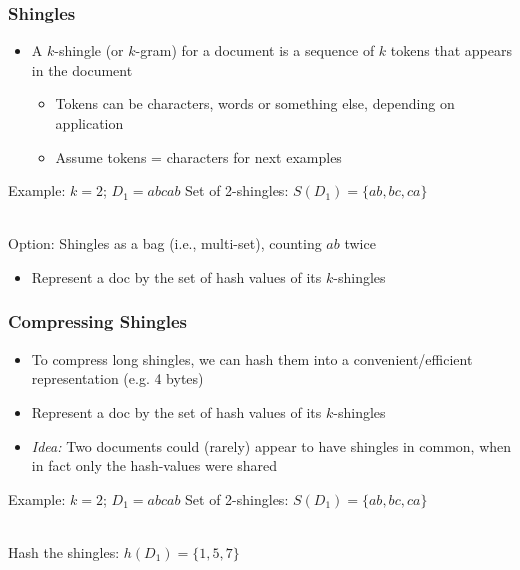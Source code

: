 \documentclass[svgnames]{beamer}
\begin{document}
\begin{frame} \frametitle{Shingles}

\begin{itemize}
\item A $k$-shingle (or $k$-gram) for a document is a sequence of $k$ tokens that appears in the document
  \begin{itemize}
  \item Tokens can be characters, words or something else, depending on application
  \item Assume tokens = characters for next examples
  \end{itemize}
\end{itemize}

\begin{block}{Example: $k=2$; $D_1=abcab$}
  Set of 2-shingles: $S(D_1)=\{ab, bc, ca\}$
  
  ~\\
  Option: Shingles as a bag (i.e., multi-set), counting $ab$ twice
\end{block}
\begin{itemize}
\item Represent a doc by the set of hash values of its $k$-shingles
\end{itemize}

\end{frame}

  
\begin{frame} \frametitle{Compressing Shingles}

\begin{itemize}
\item To compress long shingles, we can hash them into a convenient/efficient representation (e.g. 4 bytes)

\item Represent a doc by the set of hash values of its $k$-shingles

\item \emph{Idea:} Two documents could (rarely) appear to have shingles in common, when in fact only the hash-values were shared
\end{itemize}

\begin{block}{Example: $k=2$; $D_1=abcab$}
  Set of 2-shingles: $S(D_1)=\{ab, bc, ca\}$
  
  ~\\
  Hash the shingles: $h(D_1)=\{1, 5, 7\}$
\end{block}
\end{frame}
\end{document}
